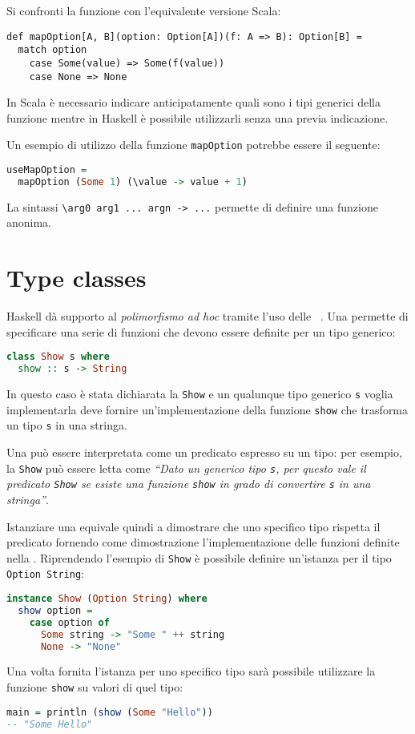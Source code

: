 Si confronti la funzione con l'equivalente versione Scala:
\begin{lstlisting}[language=scala3]
def mapOption[A, B](option: Option[A])(f: A => B): Option[B] =
  match option
    case Some(value) => Some(f(value))
    case None => None
\end{lstlisting}
In Scala è necessario indicare anticipatamente quali sono i tipi generici della funzione mentre in Haskell è possibile utilizzarli senza una previa indicazione.

Un esempio di utilizzo della funzione \lstinline{mapOption} potrebbe essere il seguente:
\begin{lstlisting}[language=haskell]
useMapOption =
  mapOption (Some 1) (\value -> value + 1)
\end{lstlisting}
La sintassi \lstinline{\arg0 arg1 ... argn -> ...} permette di definire una funzione anonima.

\section{Type classes}
Haskell dà supporto al \emph{polimorfismo ad hoc} tramite l'uso delle ~\cite{cit:type-classes-in-haskell}.
Una  permette di specificare una serie di funzioni che devono essere definite per un tipo generico:
\begin{lstlisting}[language=haskell]
class Show s where
  show :: s -> String
\end{lstlisting}
In questo caso è stata dichiarata la  \lstinline{Show} e un qualunque tipo generico \lstinline{s} voglia implementarla deve fornire un'implementazione della funzione \lstinline{show} che trasforma un tipo \lstinline{s} in una stringa.

Una  può essere interpretata come un predicato espresso su un tipo: per esempio, la  \lstinline{Show} può essere letta come \emph{``Dato un generico tipo \lstinline{s}, per questo vale il predicato \lstinline{Show} se esiste una funzione \lstinline{show} in grado di convertire \lstinline{s} in una stringa''}.

Istanziare una  equivale quindi a dimostrare che uno specifico tipo rispetta il predicato fornendo come dimostrazione l'implementazione delle funzioni definite nella .
Riprendendo l'esempio di \lstinline{Show} è possibile definire un'istanza per il tipo \lstinline{Option String}:
\begin{lstlisting}[language=haskell]
instance Show (Option String) where
  show option =
    case option of
      Some string -> "Some " ++ string
      None -> "None"
\end{lstlisting}
Una volta fornita l'istanza per uno specifico tipo sarà possibile utilizzare la funzione \lstinline{show} su valori di quel tipo:
\begin{lstlisting}[language=haskell]
main = println (show (Some "Hello"))
-- "Some Hello"
\end{lstlisting}

